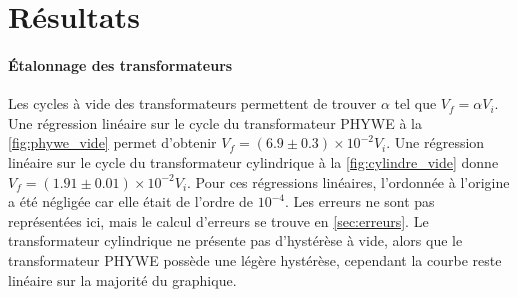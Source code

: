 \section{Résultats}

\paragraph{Étalonnage des transformateurs}
Les cycles à vide des transformateurs permettent de trouver \(\alpha\) tel que \(V_f = \alpha V_i\). Une régression linéaire sur le cycle du transformateur PHYWE à la \autoref{fig:phywe_vide} permet d'obtenir \mbox{\(V_f = (6.9 \pm 0.3)\times 10^{-2} V_i\)}. Une régression linéaire sur le cycle du transformateur cylindrique à la \autoref{fig:cylindre_vide} donne \mbox{\(V_f = (1.91 \pm 0.01)\times 10^{-2} V_i\)}. Pour ces régressions linéaires, l'ordonnée à l'origine a été négligée car elle était de l'ordre de \(10^{-4}\). Les erreurs ne sont pas représentées ici, mais le calcul d'erreurs se trouve en \autoref{sec:erreurs}. Le transformateur cylindrique ne présente pas d'hystérèse à vide, alors que le transformateur PHYWE possède une légère hystérèse, cependant la courbe reste linéaire sur la majorité du graphique.

